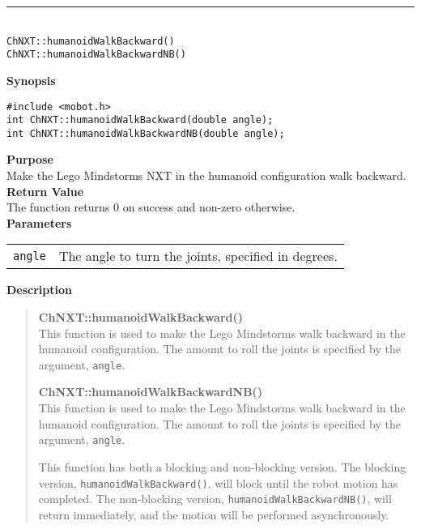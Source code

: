 \noindent
\vspace{5pt}
\rule{4.5in}{0.015in}\\
\noindent
{\LARGE \texttt{ChNXT::humanoidWalkBackward()}}\\
{\LARGE \texttt{ChNXT::humanoidWalkBackwardNB()}}\\
{}

\noindent
{\bf Synopsis}
\vspace{-8pt}
\begin{verbatim}
#include <mobot.h>
int ChNXT::humanoidWalkBackward(double angle);
int ChNXT::humanoidWalkBackwardNB(double angle);
\end{verbatim}

\noindent
{\bf Purpose}\\
Make the Lego Mindstorms NXT in the humanoid configuration walk backward.\\

\noindent
{\bf Return Value}\\
The function returns 0 on success and non-zero otherwise.\\

\noindent
{\bf Parameters}\\
\vspace{-0.1in}
\begin{description}
\item               
\begin{tabular}{p{15 mm}p{145 mm}}
\texttt{angle} & The angle to turn the joints, specified in degrees.\\
\end{tabular}
\end{description}

\noindent
{\bf Description}\\
\vspace{-12pt}
\begin{quote}
{\bf ChNXT::humanoidWalkBackward()}\\
This function is used to make the Lego Mindstorms walk backward in the humanoid
configuration. The amount to roll the joints is specified by the argument,
\texttt{angle}.

{\bf ChNXT::humanoidWalkBackwardNB()}\\
This function is used to make the Lego Mindstorms walk backward in the humanoid
configuration. The amount to roll the joints is specified by the argument,
\texttt{angle}.

This function has both a blocking and non-blocking version.
The blocking version, \texttt{humanoidWalkBackward()}, will block until the
robot motion has completed. The non-blocking version, \texttt{humanoidWalkBackwardNB()},
will return immediately, and the motion will be performed asynchronously.\\
\end{quote}

